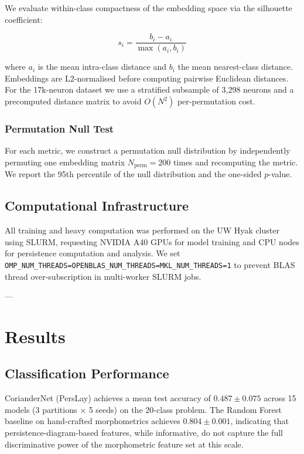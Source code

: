 We evaluate within-class compactness of the embedding space via the silhouette
coefficient:

\begin{equation}
  s_i = \frac{b_i - a_i}{\max(a_i, b_i)}
\end{equation}

where $a_i$ is the mean intra-class distance and $b_i$ the mean nearest-class
distance.  Embeddings are L2-normalised before computing pairwise Euclidean
distances.  For the 17k-neuron dataset we use a stratified subsample of 3,298
neurons and a precomputed distance matrix to avoid $O(N^2)$ per-permutation cost.

\subsubsection{Permutation Null Test}

For each metric, we construct a permutation null distribution by independently
permuting one embedding matrix $N_\text{perm}=200$ times and recomputing the
metric.  We report the 95th percentile of the null distribution and the
one-sided $p$-value.

\subsection{Computational Infrastructure}

All training and heavy computation was performed on the UW Hyak cluster using
SLURM, requesting NVIDIA A40 GPUs for model training and CPU nodes for
persistence computation and analysis.  We set
\texttt{OMP\_NUM\_THREADS=OPENBLAS\_NUM\_THREADS=MKL\_NUM\_THREADS=1} to
prevent BLAS thread over-subscription in multi-worker SLURM jobs.

---

\section{Results}

\subsection{Classification Performance}

CorianderNet (PersLay) achieves a mean test accuracy of $0.487 \pm 0.075$ across
15 models (3 partitions × 5 seeds) on the 20-class problem.  The Random Forest
baseline on hand-crafted morphometrics achieves $0.804 \pm 0.001$, indicating
that persistence-diagram-based features, while informative, do not capture the
full discriminative power of the morphometric feature set at this scale.

